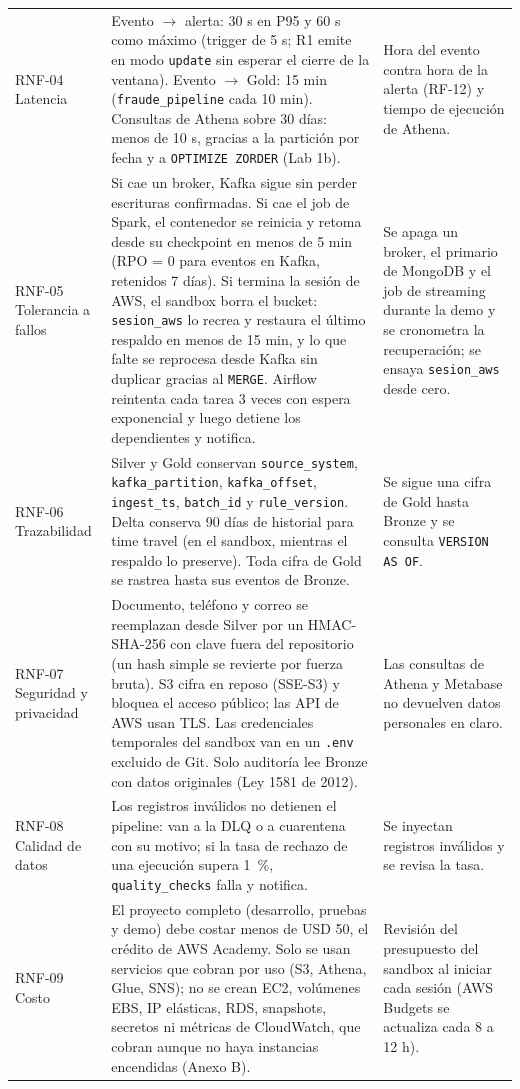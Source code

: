\documentclass[12pt,letterpaper]{article}
\newcommand{\code}[1]{{\small\texttt{#1}}}
\begin{document}
\begin{footnotesize}
\begin{longtable}{@{}P{0.8in}P{3.95in}P{1.7in}@{}}
RNF-04 Latencia & Evento $\rightarrow$ alerta: 30 s en P95 y 60 s como máximo (trigger de 5 s; R1 emite en modo \code{update} sin esperar el cierre de la ventana). Evento $\rightarrow$ Gold: 15 min (\code{fraude\_pipeline} cada 10 min). Consultas de Athena sobre 30 días: menos de 10 s, gracias a la partición por fecha y a \code{OPTIMIZE ZORDER} (Lab 1b). & Hora del evento contra hora de la alerta (RF-12) y tiempo de ejecución de Athena.\\[1pt]
RNF-05 Tolerancia a fallos & Si cae un broker, Kafka sigue sin perder escrituras confirmadas. Si cae el job de Spark, el contenedor se reinicia y retoma desde su checkpoint en menos de 5 min (RPO = 0 para eventos en Kafka, retenidos 7 días). Si termina la sesión de AWS, el sandbox borra el bucket: \code{sesion\_aws} lo recrea y restaura el último respaldo en menos de 15 min, y lo que falte se reprocesa desde Kafka sin duplicar gracias al \code{MERGE}. Airflow reintenta cada tarea 3 veces con espera exponencial y luego detiene los dependientes y notifica. & Se apaga un broker, el primario de MongoDB y el job de streaming durante la demo y se cronometra la recuperación; se ensaya \code{sesion\_aws} desde cero.\\[1pt]
RNF-06 Trazabilidad & Silver y Gold conservan \code{source\_system}, \code{kafka\_partition}, \code{kafka\_offset}, \code{ingest\_ts}, \code{batch\_id} y \code{rule\_version}. Delta conserva 90 días de historial para time travel (en el sandbox, mientras el respaldo lo preserve). Toda cifra de Gold se rastrea hasta sus eventos de Bronze. & Se sigue una cifra de Gold hasta Bronze y se consulta \code{VERSION AS OF}.\\[1pt]
RNF-07 Seguridad y privacidad & Documento, teléfono y correo se reemplazan desde Silver por un HMAC-SHA-256 con clave fuera del repositorio (un hash simple se revierte por fuerza bruta). S3 cifra en reposo (SSE-S3) y bloquea el acceso público; las API de AWS usan TLS. Las credenciales temporales del sandbox van en un \code{.env} excluido de Git. Solo auditoría lee Bronze con datos originales (Ley 1581 de 2012). & Las consultas de Athena y Metabase no devuelven datos personales en claro.\\[1pt]
RNF-08 Calidad de datos & Los registros inválidos no detienen el pipeline: van a la DLQ o a cuarentena con su motivo; si la tasa de rechazo de una ejecución supera 1~\%, \code{quality\_checks} falla y notifica. & Se inyectan registros inválidos y se revisa la tasa.\\[1pt]
RNF-09 Costo & El proyecto completo (desarrollo, pruebas y demo) debe costar menos de USD 50, el crédito de AWS Academy. Solo se usan servicios que cobran por uso (S3, Athena, Glue, SNS); no se crean EC2, volúmenes EBS, IP elásticas, RDS, snapshots, secretos ni métricas de CloudWatch, que cobran aunque no haya instancias encendidas (Anexo B). & Revisión del presupuesto del sandbox al iniciar cada sesión (AWS Budgets se actualiza cada 8 a 12 h).\\
\end{longtable}
\end{footnotesize}
\end{document}

